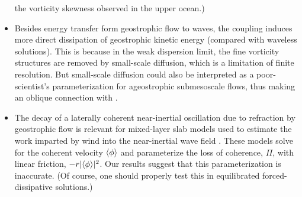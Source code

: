 \documentclass{jfm}
\begin{document}
\begin{itemize}
        the vorticity skewness observed in the upper ocean.)
  \item Besides energy transfer form geostrophic flow to waves, the coupling induces
        more direct dissipation of geostrophic kinetic energy (compared with waveless
        solutions). This is because in the weak dispersion limit, the fine vorticity
        structures are removed by small-scale diffusion, which is a limitation of
        finite resolution. But small-scale diffusion could also be interpreted as
        a poor-scientist's parameterization for ageostrophic submesoscale flows,
        thus making an oblique connection with \cite{barkan_etal2016}.
  \item The decay of a laterally coherent near-inertial oscillation due to refraction by
        geostrophic flow is relevant for mixed-layer slab models used to estimate the work
        imparted by wind into the near-inertial wave field \citep[e.g., ][]{alford2001}.
        These models solve for the coherent velocity $\langle\phi\rangle$ and parameterize
        the loss of coherence, $\Pi$, with linear friction, $-r |\langle\phi\rangle|^2$.
        Our results suggest that this parameterization is inaccurate. (Of course, one
        should properly test this in equilibrated forced-dissipative solutions.)
\end{itemize}



\end{document}
